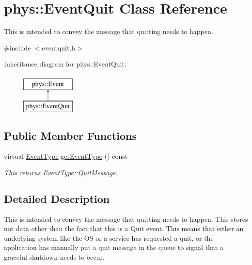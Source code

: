 \hypertarget{classphys_1_1EventQuit}{
\section{phys::EventQuit Class Reference}
\label{dd/dea/classphys_1_1EventQuit}
}


This is intended to convey the message that quitting needs to happen.  




{\ttfamily \#include $<$eventquit.h$>$}

Inheritance diagram for phys::EventQuit:\begin{figure}[H]
\begin{center}
\leavevmode
\includegraphics[height=2cm]{dd/dea/classphys_1_1EventQuit}
\end{center}
\end{figure}
\subsection*{Public Member Functions}
\begin{DoxyCompactItemize}
\item 
virtual \hyperlink{classphys_1_1Event_af5fdbb3e08d8e578d58770fbc606fda7}{EventType} \hyperlink{classphys_1_1EventQuit_a4df44098d0ef838db55a8e2a016d0724}{getEventType} () const 
\begin{DoxyCompactList}\small\item\em This returns EventType::QuitMessage. \item\end{DoxyCompactList}\end{DoxyCompactItemize}


\subsection{Detailed Description}
This is intended to convey the message that quitting needs to happen. This stores not data other than the fact that this is a Quit event. This means that either an underlying system like the OS or a service has requested a quit, or the application has manually put a quit message in the queue to signal that a graceful shutdown needs to occur. 


